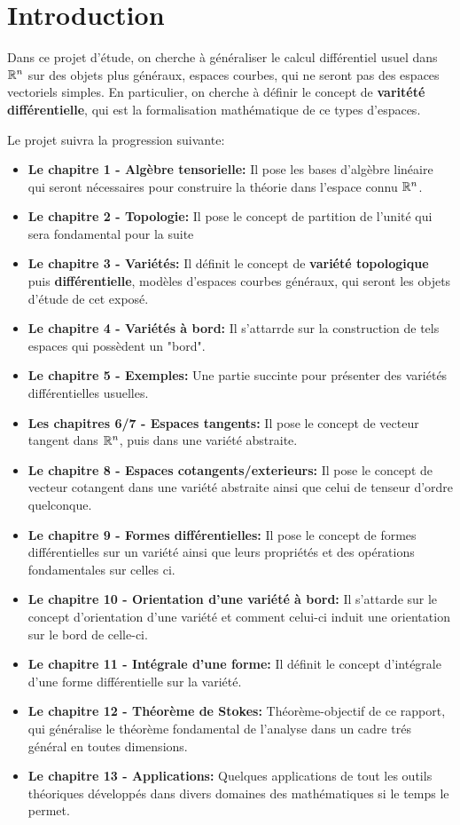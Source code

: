 \setcounter{chapter}{-1}
\chapter{Introduction}
   Dans ce projet d'étude, on cherche à généraliser le calcul différentiel usuel dans \( \mathbb{R}^n \) sur des objets plus généraux, espaces courbes, qui ne seront pas des espaces vectoriels simples. En particulier, on cherche à définir le concept de \textbf{varitété différentielle}, qui est la formalisation mathématique de ce types d'espaces.\< 
   
   Le projet suivra la progression suivante:
   \begin{itemize}
      \item \textbf{Le chapitre 1 - Algèbre tensorielle:} Il pose les bases d'algèbre linéaire qui seront nécessaires pour construire la théorie dans l'espace connu \( \mathbb{R}^n \).
      \item \textbf{Le chapitre 2 - Topologie:} Il pose le concept de partition de l'unité qui sera fondamental pour la suite
      \item \textbf{Le chapitre 3 - Variétés:} Il définit le concept de \textbf{variété topologique} puis \textbf{différentielle}, modèles d'espaces courbes généraux, qui seront les objets d'étude de cet exposé. 
      \item \textbf{Le chapitre 4 - Variétés à bord:} Il s'attarrde sur la construction de tels espaces qui possèdent un "bord".
      \item \textbf{Le chapitre 5 - Exemples:} Une partie succinte pour présenter des variétés différentielles usuelles.
      \item \textbf{Les chapitres 6/7 - Espaces tangents:} Il pose le concept de vecteur tangent dans \( \mathbb{R}^n \), puis dans une variété abstraite.
      \item \textbf{Le chapitre 8 - Espaces cotangents/exterieurs:} Il pose le concept de vecteur cotangent dans une variété abstraite ainsi que celui de tenseur d'ordre quelconque.
      \item \textbf{Le chapitre 9 - Formes différentielles:} Il pose le concept de formes différentielles sur un variété ainsi que leurs propriétés et des opérations fondamentales sur celles ci.
      \item \textbf{Le chapitre 10 - Orientation d'une variété à bord:} Il s'attarde sur le concept d'orientation d'une variété et comment celui-ci induit une orientation sur le bord de celle-ci.
      \item \textbf{Le chapitre 11 - Intégrale d’une forme:} Il définit le concept d'intégrale d'une forme différentielle sur la variété.
      \item \textbf{Le chapitre 12 - Théorème de Stokes:} Théorème-objectif de ce rapport, qui généralise le théorème fondamental de l'analyse dans un cadre trés général en toutes dimensions.
      \item \textbf{Le chapitre 13 - Applications:} Quelques applications de tout les outils théoriques développés dans divers domaines des mathématiques si le temps le permet.
   \end{itemize}